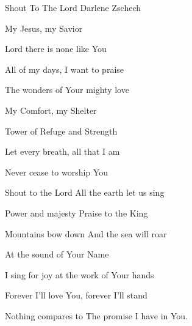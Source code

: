 \documentclass[12pt]{book}
\begin{document}
\begin{song}{Shout To The Lord}{}
  {}
  {Darlene Zschech}
  {}
  {}

  \begin{SBVerse}
    My Jesus, my Savior

    Lord there is none like You

    All of my days, I want to praise

    The wonders of Your mighty love

    My Comfort, my Shelter

    Tower of Refuge and Strength

    Let every breath, all that I am

    Never cease to worship You
  \end{SBVerse}

  \begin{SBOpGroup}
    Shout to the Lord All the earth let us sing

    Power and majesty Praise to the King

    Mountains bow down And the sea will roar

    At the sound of Your Name

    I sing for joy at the work of Your hands

    Forever I'll love You, forever I'll stand

    Nothing compares to The promise I have in You.
  \end{SBOpGroup}
\end{song}
\end{document}
